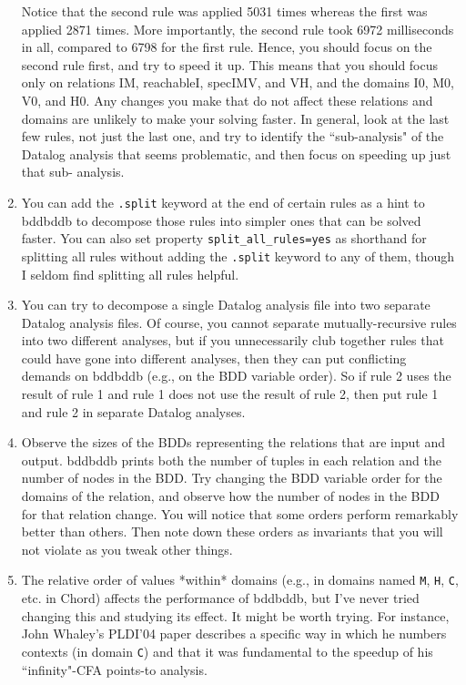 \begin{enumerate}
Notice that the second rule was applied 5031 times whereas the first
was applied 2871 times.  More importantly, the second rule took 6972
milliseconds in all, compared to 6798 for the first rule.  Hence, you
should focus on the second rule first, and try to speed it up.  This
means that you should focus only on relations IM, reachableI, specIMV,
and VH, and the domains I0, M0, V0, and H0.  Any changes you make that
do not affect these relations and domains are unlikely to make your
solving faster.  In general, look at the last few rules, not just the
last one, and try to identify the ``sub-analysis" of the Datalog analysis
that seems problematic, and then focus on speeding up just that sub-
analysis.

\item

You can add the \verb+.split+ keyword at the end of certain rules as a
hint to bddbddb to decompose those rules into simpler ones that can be
solved faster.  You can also set property \verb+split_all_rules=yes+ as shorthand
for splitting all rules without adding the \verb+.split+ keyword to any of
them, though I seldom find splitting all rules helpful.

\item

You can try to decompose a single Datalog analysis file into two separate Datalog analysis
files.  Of course, you cannot separate mutually-recursive rules into two
different analyses, but if you unnecessarily club
together rules that could have gone into different analyses, then they
can put conflicting demands on bddbddb (e.g., on the BDD variable order).
So if rule 2 uses the result of rule 1 and rule 1 does not use the result of
rule 2, then put rule 1 and rule 2 in separate Datalog analyses.

\item

Observe the sizes of the BDDs representing the relations that are
input and output.  bddbddb prints both the number of tuples in each
relation and the number of nodes in the BDD.  Try changing the
BDD variable order for the domains of the relation, and observe how the
number of nodes in the BDD for that relation change.  You will
notice that some orders perform remarkably better than others.  Then
note down these orders as invariants that you will not violate as
you tweak other things.

\item

The relative order of values *within* domains (e.g.,
in domains named \verb+M+, \verb+H+, \verb+C+, etc. in Chord) affects the
performance of bddbddb, but
I've never tried changing this and studying its effect.  It might be
worth trying.  For instance, John Whaley's PLDI'04 paper describes a
specific way in which he numbers contexts (in domain \verb+C+) and that it was
fundamental to the speedup of his ``infinity"-CFA points-to analysis.


\end{enumerate}
